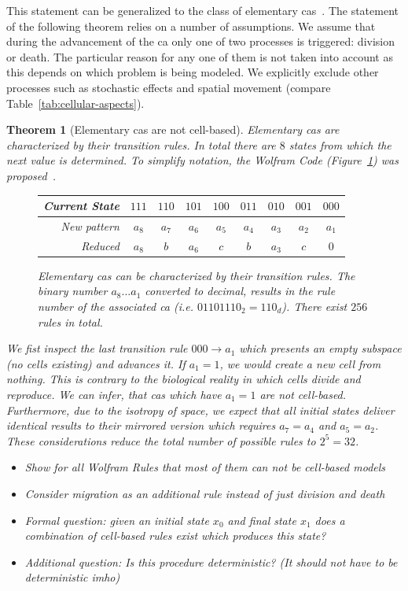 \documentclass{article}
\newtheorem{theorem}[definition]{Theorem}
\begin{document}
This statement can be generalized to the class of elementary \acp{ca}~\cite{Wolfram1983}.
The statement of the following theorem relies on a number of assumptions.
We assume that during the advancement of the \ac{ca} only one of two processes is triggered:
division or death.
The particular reason for any one of them is not taken into account as this depends on which
problem is being modeled.
We explicitly exclude other processes such as stochastic effects and spatial movement
(compare Table~\ref{tab:cellular-aspects}).

\begin{theorem}[Elementary \aclp{ca} are not cell-based]
    Elementary \acp{ca} are characterized by their transition rules.
    In total there are $8$ states from which the next value is determined.
    To simplify notation, the Wolfram Code (Figure~\ref{fig:wolfram-code}) was
    proposed~\cite{Wolfram1994-yw}.
    \begin{figure}[h]
        \centering
        \begin{tabular}{ r c c c c c c c c }
            Current State & $111$ & $110$ & $101$ & $100$ & $011$ & $010$ & $001$ & $000$\\
            \hline
            New pattern & $a_8$ & $a_7$ & $a_6$ & $a_5$ & $a_4$ & $a_3$ & $a_2$ & $a_1$\\
            Reduced     & $a_8$ & $b$   & $a_6$ & $c$   & $b$   & $a_3$ & $c$   & $0$
        \end{tabular}
        \caption{
            Elementary \acp{ca} can be characterized by their transition rules.
            The binary number $a_8\dots a_1$ converted to decimal, results in the rule number of
            the associated \ac{ca} (i.e. $01101110_2=110_d$).
            There exist $256$ rules in total.
        }
        \label{fig:wolfram-code}
    \end{figure}
    We fist inspect the last transition rule $000\rightarrow a_1$ which presents an empty subspace
    (no cells existing) and advances it.
    If $a_1=1$, we would create a new cell from nothing.
    This is contrary to the biological reality in which cells divide and reproduce.
    We can infer, that \acp{ca} which have $a_1=1$ are not cell-based.
    Furthermore, due to the isotropy of space, we expect that all initial states deliver identical
    results to their mirrored version which requires $a_7=a_4$ and $a_5=a_2$.
    These considerations reduce the total number of possible rules to $2^5=32$.

    \begin{itemize}
        \item Show for all Wolfram Rules that most of them can not be cell-based models
        \item Consider migration as an additional rule instead of just division and death
        \item Formal question: given an initial state $x_0$ and final state $x_1$ does a combination
            of cell-based rules exist which produces this state?
        \item Additional question: Is this procedure deterministic? (It should not have to be
            deterministic imho)
    \end{itemize}
\end{theorem}
\end{document}
